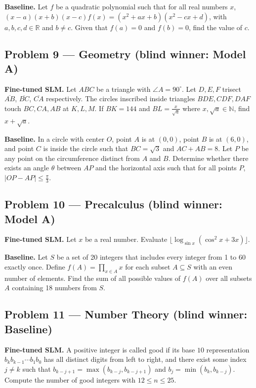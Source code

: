 \documentclass[11pt]{article}
\begin{document}
\medskip

\textbf{Baseline.} Let $f$ be a quadratic polynomial such that for all real numbers $x$, $(x - a)(x + b)(x - c) f(x) = (x^2 + ax + b)(x^2 - cx + d)$, with $a,b,c,d \in \mathbb{R}$ and $b \neq c$. Given that $f(a) = 0$ and $f(b) = 0$, find the value of $c$.

\subsection*{Problem 9 --- Geometry \quad (blind winner: Model A)}

\textbf{Fine-tuned SLM.} Let $ABC$ be a triangle with $\angle A=90^{\circ}$. Let $D,E,F$ trisect $\overline{AB}$, $\overline{BC}$, $\overline{CA}$ respectively. The circles inscribed inside triangles $BDE, CDF, DAF$ touch $BC, CA, AB$ at $K,L,M$. If $BK=144$ and $BL=\frac{x}{\sqrt{a}}$ where $x,\sqrt{a}\in \mathbb{N}$, find $x+\sqrt{a}$.

\medskip

\textbf{Baseline.} In a circle with center $O$, point $A$ is at $(0,0)$, point $B$ is at $(6,0)$, and point $C$ is inside the circle such that $BC = \sqrt{3}$ and $AC + AB = 8$. Let $P$ be any point on the circumference distinct from $A$ and $B$. Determine whether there exists an angle $\theta$ between $AP$ and the horizontal axis such that for all points $P$, $|OP - AP| \leq \frac{\pi}{3}$.

\subsection*{Problem 10 --- Precalculus \quad (blind winner: Model A)}

\textbf{Fine-tuned SLM.} Let $x$ be a real number. Evaluate $\lfloor\log_{\sin x}(\cos^2 x+3x)\rfloor$.

\medskip

\textbf{Baseline.} Let $S$ be a set of 20 integers that includes every integer from 1 to 60 exactly once. Define $f(A) = \prod_{x \in A} x$ for each subset $A \subseteq S$ with an even number of elements. Find the sum of all possible values of $f(A)$ over all subsets $A$ containing 18 numbers from $S$.

\subsection*{Problem 11 --- Number Theory \quad (blind winner: Baseline)}

\textbf{Fine-tuned SLM.} A positive integer is called good if its base $10$ representation $b_{k} b_{k - 1}\cdots b_{1}b_{0}$ has all distinct digits from left to right, and there exist some index $j \neq k$ such that $b_{k - j + 1} = \max (b_{k - j}, b_{k - j + 1})$ and $b_{j} = \min (b_{k}, b_{k - j})$. Compute the number of good integers with $12 \leq n \leq 25$.
\end{document}
